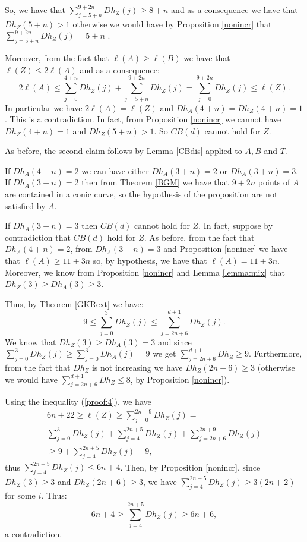 \documentclass[a4paper,10pt,oneside]{article}
\theoremstyle{casep}
\theoremstyle{definition}
\begin{document}
 So, we have that $\sum_{j=5+n}^{9+2n} Dh_Z(j)\geq 8+n$ and as a consequence we have that $ Dh_Z(5+n) >1 $ otherwise we would have by Proposition \ref{nonincr} that $\sum_{j=5+n}^{9+2n}Dh_Z(j)=5+n $ .
 
 Moreover, from the fact that $ \ell(A)\geq \ell(B) $ we have that $ \ell(Z)\leq 2 \ell(A) $ and as a consequence:
 $$ 2\ell(A)\leq \sum_{j=0}^{4+n}Dh_Z(j) +\sum_{j=5+n}^{9+2n}Dh_Z(j)= \sum_{j=0}^{9+2n}Dh_Z(j) \leq \ell(Z).$$
 In particular we have $ 2 \ell(A)=\ell(Z) $ and $ Dh_A(4+n)=Dh_Z(4+n)=1 $. This is a contradiction. In fact, from Proposition \ref{nonincr} we cannot have $ Dh_Z(4+n)=1 $ and $ Dh_Z(5+n)>1 $. So $CB(d)$ cannot hold for $ Z $.

As before, the second claim follows by Lemma \ref{CBdis} applied to $A,B$ and $T$.

If $ Dh_A(4+n)=2 $ we can have either $ Dh_A(3+n)=2 $ or $ Dh_A(3+n)=3 $.
If $ Dh_A(3+n)=2 $ then from Theorem \ref{BGM} we have that $ 9+2n $ points of $ A $ are contained in a conic curve, so the hypothesis of the proposition are not satisfied by $ A $. 

If $ Dh_A(3+n)=3 $ then $CB(d) $ cannot hold for $ Z $.
In fact, suppose by contradiction that $CB(d)$ hold for $ Z $.
As before, from the fact that $ Dh_A(4+n)=2 $, from $ Dh_A(3+n)=3 $ and Proposition \ref{nonincr} we have that $ \ell(A)\geq 11+3n $ so, by hypothesis, we have that $ \ell(A)= 11+3n $.
Moreover, we know from Proposition \ref{nonincr} and Lemma \ref{lemma:mix} that $ Dh_Z(3) \geq Dh_A(3) \geq 3 $. 

Thus, by Theorem \ref{GKRext} we have:
\begin{equation}9 \leq \sum_{j=0}^{3}Dh_Z(j) \leq \sum_{j=2n+6}^{d+1}Dh_Z(j).\label{proof:4} \end{equation}
We know that $Dh_Z(3)\geq Dh_A(3)=3$ and since {\small $\sum_{j=0}^{3}Dh_Z(j)\geq \sum_{j=0}^{3}Dh_A(j)=9$ }
we get $ \sum_{j=2n+6}^{d+1} Dh_Z \geq 9$.
Furthermore, from the fact that $Dh_Z$ is not increasing we have $Dh_Z(2n+6)\geq 3$ (otherwise we would have $\sum_{j=2n+6}^{d+1} Dh_Z \leq 8$, by Proposition \ref{nonincr}).

Using the inequality (\ref{proof:4}), we have
\begin{multline*} 6n+22\geq \ell(Z)\geq \sum_{j=0}^{2n+9}Dh_Z(j) = \\ \sum_{j=0}^{3}Dh_Z(j)+ \sum_{j=4}^{2n+5}Dh_Z(j)+\sum_{j=2n+6}^{2n+9}Dh_Z(j)
\\ \geq 9 + \sum_{j=4}^{2n+5}Dh_Z(j) + 9,\end{multline*}
thus $\sum_{j=4}^{2n+5}Dh_Z(j) \leq 6n +4$. Then, by Proposition \ref{nonincr}, since $Dh_Z(3)\geq 3$ and $Dh_Z(2n+6)\geq 3$, 
we have $\sum_{j=4}^{2n+5}Dh_Z(j) \geq 3(2n+2)$ for some $i$. Thus:
$$ 6n + 4 \geq \sum_{j=4}^{2n+5}Dh_Z(j) \geq 6n+6,$$
a contradiction.
\end{document}
